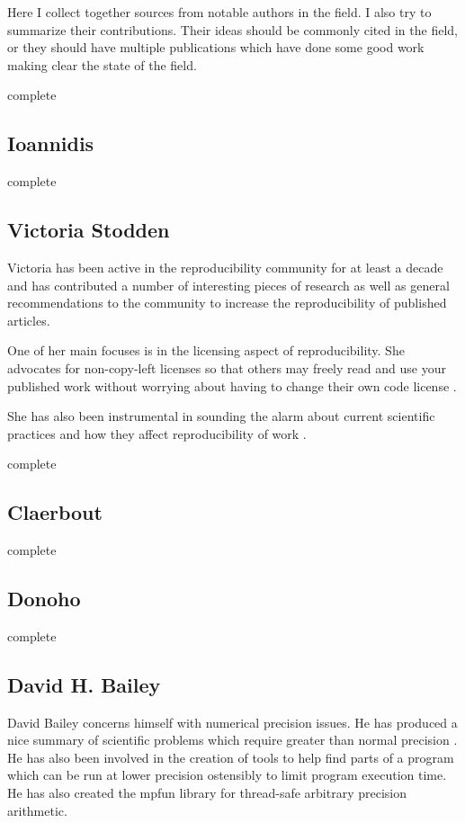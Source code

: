 \documentclass[american]{article}
\newcommand{\complete}{
	\gls{complete}
}
\begin{document}
Here I collect together sources from notable authors in the field. I also try to summarize their contributions. Their ideas should be commonly cited in the field, or they should have multiple publications which have done some good work making clear the state of the field.

\complete

\subsection{Ioannidis}

\complete

\subsection{Victoria Stodden}

Victoria has been active in the reproducibility community for at least a decade and has contributed a number of interesting pieces of research as well as general recommendations to the community to increase the reproducibility of published articles.

One of her main focuses is in the licensing aspect of reproducibility. She advocates for non-copy-left licenses so that others may freely read and use your published work without worrying about having to change their own code license \cite{stodden-legal-framework-reproducible-2009}.

She has also been instrumental in sounding the alarm about current scientific practices and how they affect reproducibility of work \cite{stodden-reproducibility-crisis}.

\complete

\subsection{Claerbout}

\complete

\subsection{Donoho}

\complete

\subsection{David H. Bailey}

David Bailey concerns himself with numerical precision issues. He has produced a nice summary of scientific problems which require greater than normal precision \cite{high-precision-arith-in-science,dhb-zurich-hp}. He has also been involved in the creation of tools to help find parts of a program which can be run at lower precision ostensibly to limit program execution time\cite{blame-analysis}. He has also created the mpfun library for thread-safe arbitrary precision arithmetic\cite{mpfun}.
\end{document}
